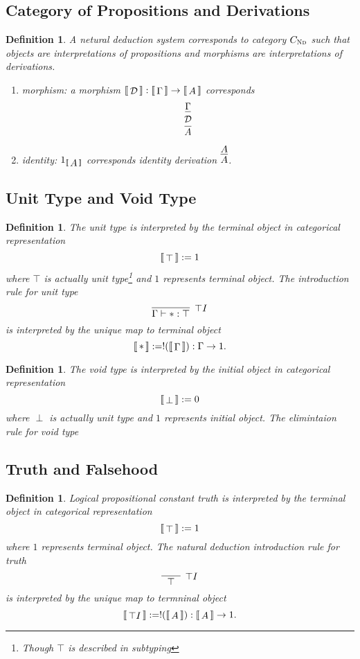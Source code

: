 \documentclass{article}
\newtheorem{definition}[theorem]{Definition}
\newcommand{\dbracket}[1]{\ensuremath{\left\llbracket\,\vcenter{\hbox{$#1$}}\,\right\rrbracket}}
\begin{document}
\newpage
\subsection{Category of Propositions and Derivations}

\begin{definition}
\rm A netural deduction system corresponds to category $C_{\textsc{Nd}}$ such that objects are interpretations of propositions and morphisms are interpretations of derivations. 
\begin{enumerate}
	\item \emph{morphism}: a morphism $\dbracket{\mathcal{D}}:\dbracket{\Gamma} \to \dbracket{A}$ corresponds \[\deduce[\mathcal{D}]{\infer{A}{}}{\infer{}{\Gamma}}\]
	\item \emph{identity}: $1_{\dbracket{A}}$ corresponds identity derivation $\infer{A}{A}$. 
\end{enumerate} 
\end{definition}

\newpage
\subsection{Unit Type and Void Type}

\begin{definition}
\rm The unit type is interpreted by the terminal object in categorical representation
$$
\dbracket{\top} := 1
$$
where $\top$ is actually unit type\footnote{Though $\top$ is described in subtyping} and $1$ represents terminal object. The introduction rule for unit type 
$$
\infer[\top I]{\Gamma \vdash *: \top}{}
$$
is interpreted by the unique map to terminal object
$$
\dbracket{*} := !(\dbracket{\Gamma}):\Gamma \to 1.
$$   
\end{definition}

\begin{definition}
\rm The void type is interpreted by the initial object in categorical representation
$$
\dbracket{\perp} := 0
$$
where $\perp$ is actually unit type and $1$ represents initial object. The elimintaion rule for void type 
\end{definition}


\newpage
\subsection{Truth and Falsehood}

\begin{definition}
\rm Logical propositional constant truth is interpreted by the terminal object in categorical representation
$$
\dbracket{\top} := 1
$$
where $1$ represents terminal object. The natural deduction introduction rule for truth
$$
\infer[\top I]{\top}{&&}
$$
is interpreted by the unique map to termninal object
$$
\dbracket{\top I} := !(\dbracket{A}):\dbracket{A} \to 1. 
$$
\end{definition}
\end{document}
